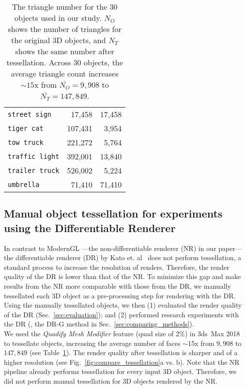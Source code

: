 \documentclass[10pt,twocolumn,letterpaper]{article}
\newcommand{\subsec}[1]{\noindent{\textbf{#1.}}}
\newcommand{\class}[1]{{\small\texttt{#1}}}
\begin{document}
\begin{table}[h]
\begin{tabular}{lrr}
		\class{street sign}          & 17,458 & 17,458\\
		\class{tiger cat}            & 107,431 & 3,954\\
		\class{tow truck}            & 221,272 & 5,764\\
		\class{traffic light}        & 392,001 & 13,840\\
		\class{trailer truck}        & 526,002 & 5,224\\
		\class{umbrella}             & 71,410 & 71,410\\
		\bottomrule
	\end{tabular}
	\caption{The triangle number for the 30 objects used in our study.  
		\(N_O\) shows the number of
		triangles for the original 3D objects, and 		\(N_T\) shows the same number after tessellation.
		  Across 30 objects, the average triangle count increases $\sim15$x from $\overline{N_O} = 9,908$ to		  
		  \(\overline{N_T} = 147,849\).}\label{tab:num_triangles}
\end{table}

\subsection{Manual object tessellation for experiments using the Differentiable Renderer}

In contrast to ModernGL \cite{modernGL}---the non-differentiable renderer (NR) in our paper---the differentiable renderer (DR) by Kato et. al~\cite{kato2018neural} does not perform tessellation, a standard process to increase the resolution of renders.
Therefore, the render quality of the DR is lower than that of the NR. 
To minimize this gap and make results from the NR more comparable with those from the DR, we manually tessellated each 3D object as a pre-processing step for rendering with the DR.
Using the manually tessellated objects, we then (1) evaluated the render quality of the DR (Sec.~\ref{sec:evaluation}); and (2) performed research experiments with the DR (\ie, the DR-G method in Sec.~\ref{sec:comparing_methods}).\\

\subsec{Tessellation} 
We used the \emph{Quadify Mesh Modifier} feature (quad size of 2\%) in 3ds~Max 2018 to tessellate objects, increasing the average number of faces $\sim$15x from $9,908$ to $147,849$ (see Table~\ref{tab:num_triangles}).
The render quality after tessellation is sharper and of a higher resolution (see Fig.~\ref{fig:compare_tessellation}a vs. b).
Note that the NR pipeline already performs tessellation for every input 3D object.
Therefore, we did not perform manual tessellation for 3D objects rendered by the NR.
\end{document}
